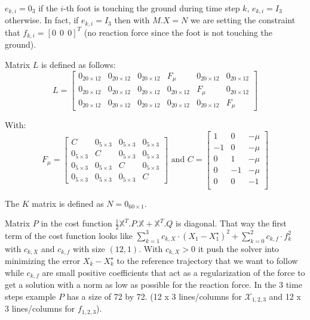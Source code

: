 \documentclass[a4paper,11pt]{article}
\begin{document}
$e_{k,i} = 0_3$ if the $i$-th foot is touching the ground during time step $k$, $e_{k,i} = I_3$ otherwise. In fact, if $e_{k,i} = I_3$ then with $M.X = N$ we are setting the constraint that $f_{k,i} = [0 ~~ 0 ~~ 0]^T$ (no reaction force since the foot is not touching the ground).

Matrix $L$ is defined as follows:
\begin{equation}
L = \begin{bmatrix} 
	0_{20\times12} & 0_{20\times12} & 0_{20\times12}  & F_\mu  & 0_{20\times12} & 0_{20\times12} \\
	0_{20\times12} & 0_{20\times12} & 0_{20\times12}  & 0_{20\times12} & F_\mu  & 0_{20\times12} \\
	0_{20\times12} & 0_{20\times12} & 0_{20\times12}  & 0_{20\times12} & 0_{20\times12} & F_\mu  \end{bmatrix}
\end{equation}

With:
\begin{equation}
F_\mu = \begin{bmatrix} 
	C  & 0_{5\times3} & 0_{5\times3} & 0_{5\times3} \\
	0_{5\times3} & C & 0_{5\times3} & 0_{5\times3} \\
	0_{5\times3}  & 0_{5\times3} & C & 0_{5\times3} \\
	0_{5\times3}  & 0_{5\times3} & 0_{5\times3} & C
\end{bmatrix} \text{ and } C = \begin{bmatrix} 
1  & 0 & -\mu \\
-1 & 0 & -\mu \\
0  & 1 & -\mu \\
0  & -1 & -\mu \\
0  & 0 & - 1 \\
\end{bmatrix}
\end{equation}

The $K$ matrix is defined as $N = 0_{60 \times 1}$.

Matrix $P$ in the cost function $\frac{1}{2}\mathbb{X}^T.P.\mathbb{X} + \mathbb{X}^T.Q$ is diagonal. That way the first term of the cost function looks like $\sum_{k=1}^{3} c_{k,X} \cdot (X_1 - X_1^\star)^2 + \sum_{k=0}^{2} c_{k,f} \cdot f_k^2$ with $c_{k,X}$ and $c_{k,f}$ with size $(12, 1)$. With $c_{k,X} > 0$ it push the solver into minimizing the error $X_k - X_k^\star$ to the reference trajectory that we want to follow while $c_{k,f}$ are small positive coefficients that act as a regularization of the force to get a solution with a norm as low as possible for the reaction force. In the 3 time steps example $P$ has a size of 72 by 72. (12 x 3 lines/columns for $\mathcal{X}_{1,2,3}$ and 12 x 3 lines/columns for $f_{1,2,3}$).
 
\end{document}
